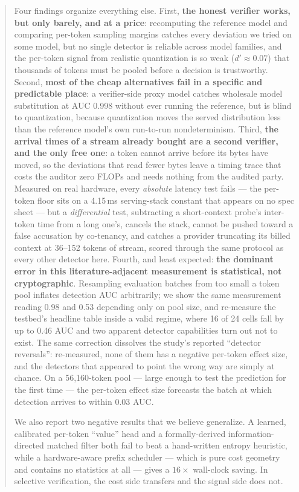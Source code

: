 \documentclass[11pt]{article}
\begin{document}
\begin{abstract}
Four findings organize everything else. First, \textbf{the honest verifier works,
but only barely, and at a price}: recomputing the reference model and comparing
per-token sampling margins catches every deviation we tried on some model, but no
single detector is reliable across model families, and the per-token signal from
realistic quantization is so weak ($d' \approx 0.07$) that thousands of tokens must
be pooled before a decision is trustworthy. Second, \textbf{most of the cheap
alternatives fail in a specific and predictable place}: a verifier-side proxy model
catches wholesale model substitution at AUC 0.998 without ever running the
reference, but is blind to quantization, because quantization moves the served
distribution less than the reference model's own run-to-run nondeterminism. Third,
\textbf{the arrival times of a stream already bought are a second verifier, and
the only free one}: a token cannot arrive before its bytes have moved, so the
deviations that read fewer bytes leave a timing trace that costs the auditor zero
FLOPs and needs nothing from the audited party. Measured on real hardware, every
\emph{absolute} latency test fails --- the per-token floor sits on a 4.15\,ms
serving-stack constant that appears on no spec sheet --- but a \emph{differential}
test, subtracting a short-context probe's inter-token time from a long one's,
cancels the stack, cannot be pushed toward a false accusation by co-tenancy, and
catches a provider truncating its billed context at 36--152 tokens of stream,
scored through the same protocol as every other detector here. Fourth, and least
expected: \textbf{the dominant error in this literature-adjacent
measurement is statistical, not cryptographic}. Resampling evaluation batches from
too small a token pool inflates detection AUC arbitrarily; we show the same
measurement reading 0.98 and 0.53 depending only on pool size, and re-measure the
testbed's headline table inside a valid regime, where 16 of 24 cells fall by up to
0.46 AUC and two apparent detector capabilities turn out not to exist. The same
correction dissolves the study's reported ``detector reversals'': re-measured, none
of them has a negative per-token effect size, and the detectors that appeared to
point the wrong way are simply at chance. On a 56{,}160-token pool --- large enough
to test the prediction for the first time --- the per-token effect size forecasts the
batch at which detection arrives to within 0.03 AUC.

We also report two negative results that we believe generalize. A learned,
calibrated per-token ``value'' head and a formally-derived information-directed
matched filter both fail to beat a hand-written entropy heuristic, while a
hardware-aware prefix scheduler --- which is pure cost geometry and contains no
statistics at all --- gives a $16\times$ wall-clock saving. In selective
verification, the cost side transfers and the signal side does not.
\end{abstract}
\end{document}
